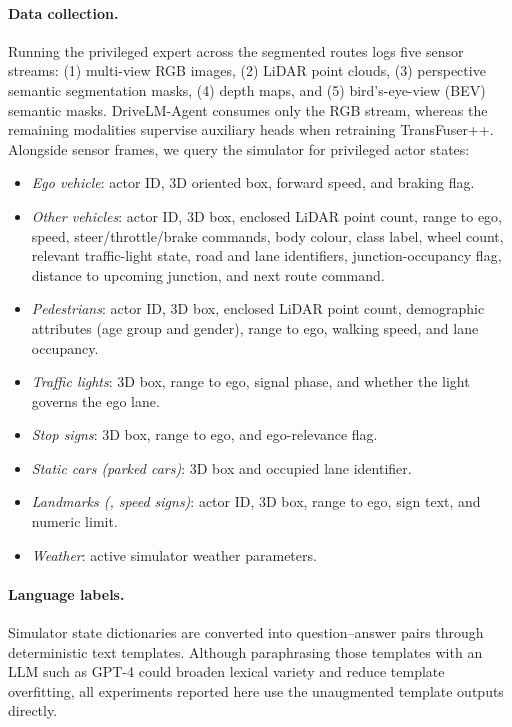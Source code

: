 \paragraph{Data collection.}
Running the privileged expert across the segmented routes logs five sensor streams: (1) multi-view RGB images, (2) LiDAR point clouds, (3) perspective semantic segmentation masks, (4) depth maps, and (5) bird's-eye-view (BEV) semantic masks. DriveLM-Agent consumes only the RGB stream, whereas the remaining modalities supervise auxiliary heads when retraining TransFuser++. Alongside sensor frames, we query the simulator for privileged actor states:
\begin{itemize}
  \item \emph{Ego vehicle}: actor ID, 3D oriented box, forward speed, and braking flag.
  \item \emph{Other vehicles}: actor ID, 3D box, enclosed LiDAR point count, range to ego, speed, steer/throttle/brake commands, body colour, class label, wheel count, relevant traffic-light state, road and lane identifiers, junction-occupancy flag, distance to upcoming junction, and next route command.
  \item \emph{Pedestrians}: actor ID, 3D box, enclosed LiDAR point count, demographic attributes (age group and gender), range to ego, walking speed, and lane occupancy.
  \item \emph{Traffic lights}: 3D box, range to ego, signal phase, and whether the light governs the ego lane.
  \item \emph{Stop signs}: 3D box, range to ego, and ego-relevance flag.
  \item \emph{Static cars (parked cars)}: 3D box and occupied lane identifier.
  \item \emph{Landmarks (\eg, speed signs)}: actor ID, 3D box, range to ego, sign text, and numeric limit.
  \item \emph{Weather}: active simulator weather parameters.
\end{itemize}

\paragraph{Language labels.}
Simulator state dictionaries are converted into question--answer pairs through deterministic text templates. Although paraphrasing those templates with an LLM such as GPT-4 could broaden lexical variety and reduce template overfitting, all experiments reported here use the unaugmented template outputs directly.

